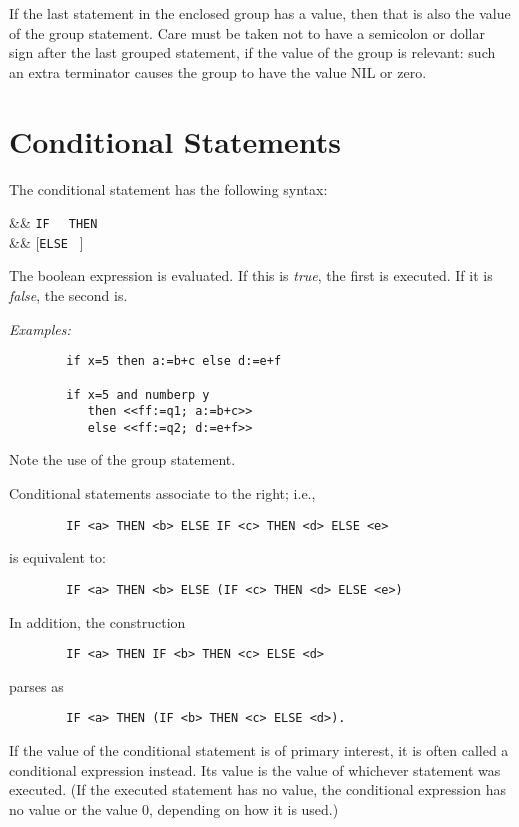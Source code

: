 If the last statement in the enclosed group has a value, then that is also
the value of the group statement.  Care must be taken not to have a
semicolon or dollar sign after the last grouped statement, if the value of
the group is relevant: such an extra terminator causes the group to have
the value NIL or zero.

\section{Conditional Statements}
\hypertarget{command:IF}{}
\hypertarget{reserved:THEN}{}
\hypertarget{reserved:ELSE}{}

The conditional statement
has the following syntax:
\begin{syntaxtable}
  &\bnfprod &
    \texttt{IF }  \texttt{ THEN }  \\
      && [\texttt{ELSE } ]
\end{syntaxtable}
The boolean expression is evaluated. If this is \emph{true}, the first
 is executed.  If it is \emph{false}, the second is.

\textit{Examples:}
\begin{verbatim}
        if x=5 then a:=b+c else d:=e+f

        if x=5 and numberp y
           then <<ff:=q1; a:=b+c>>
           else <<ff:=q2; d:=e+f>>
\end{verbatim}
Note the use of the group statement.

Conditional statements associate to the right; i.e.,
\begin{verbatim}
        IF <a> THEN <b> ELSE IF <c> THEN <d> ELSE <e>
\end{verbatim}
is equivalent to:
\begin{verbatim}
        IF <a> THEN <b> ELSE (IF <c> THEN <d> ELSE <e>)
\end{verbatim}
In addition, the construction
\begin{verbatim}
        IF <a> THEN IF <b> THEN <c> ELSE <d>
\end{verbatim}
parses as
\begin{verbatim}
        IF <a> THEN (IF <b> THEN <c> ELSE <d>).
\end{verbatim}
If the value of the conditional statement is of primary interest, it is often called a conditional
expression instead.  Its value is the value of whichever statement was
executed. (If the executed statement has no value, the conditional
expression has no value or the value 0, depending on how it is used.)

